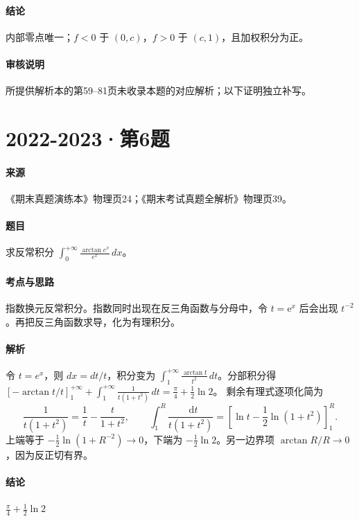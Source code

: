 \documentclass[UTF8,fontset=fandol,12pt,oneside,openany]{ctexrep}
\newcommand{\dd}{\mathop{}\!\mathrm d}
\newcommand{\ee}{\mathrm e}
\theoremstyle{definition}
\begin{document}
\paragraph{结论}
内部零点唯一；$f<0$ 于 $(0,c)$，$f>0$ 于 $(c,1)$，且加权积分为正。
\paragraph{审核说明}
所提供解析本的第59--81页未收录本题的对应解析；以下证明独立补写。

\par\addvspace{18pt}\noindent\begin{minipage}{\linewidth}
\section{2022-2023·第6题}
\label{exam:11:q7}
\paragraph{来源} 《期末真题演练本》物理页24；《期末考试真题全解析》物理页39。
\paragraph{题目}
求反常积分 $\int_0^{+\infty}\frac{\arctan e^x}{e^x}\,dx$。
\end{minipage}\par
\paragraph{考点与思路}
指数换元反常积分。指数同时出现在反三角函数与分母中，令 $t=\ee^x$ 后会出现 $t^{-2}$。再把反三角函数求导，化为有理积分。
\paragraph{解析}
令 $t=e^x$，则 $dx=dt/t$，积分变为 $\int_1^{+\infty}\frac{\arctan t}{t^2}\,dt$。分部积分得 $[-\arctan t/t]_1^{+\infty}+\int_1^{+\infty}\frac1{t(1+t^2)}\,dt=\frac\pi4+\frac12\ln2$。
剩余有理式逐项化简为
\[
\frac1{t(1+t^2)}=\frac1t-\frac{t}{1+t^2},\qquad
\int_1^R\frac{\dd t}{t(1+t^2)}
=\left[\ln t-\frac12\ln(1+t^2)\right]_1^R.
\]
上端等于 $-\frac12\ln(1+R^{-2})\to0$，下端为 $-\frac12\ln2$。另一边界项 $\arctan R/R\to0$，因为反正切有界。
\paragraph{结论}
$\frac\pi4+\frac12\ln2$
\end{document}
